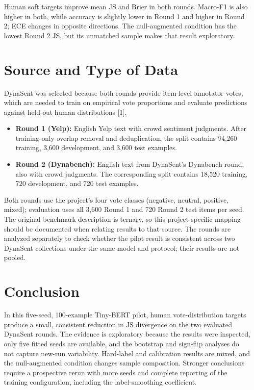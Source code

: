\documentclass[11pt,a4paper]{article}
\begin{document}
Human soft targets improve mean JS and Brier in both rounds. Macro-F1 is also higher in both, while accuracy is slightly lower in Round 1 and higher in Round 2; ECE changes in opposite directions. The null-augmented condition has the lowest Round 2 JS, but its unmatched sample makes that result exploratory.

\section{Source and Type of Data}
DynaSent was selected because both rounds provide item-level annotator votes, which are needed to train on empirical vote proportions and evaluate predictions against held-out human distributions [1].
\begin{itemize}
\item \textbf{Round 1 (Yelp):} English Yelp text with crowd sentiment judgments. After training-only overlap removal and deduplication, the split contains 94,260 training, 3,600 development, and 3,600 test examples.
\item \textbf{Round 2 (Dynabench):} English text from DynaSent's Dynabench round, also with crowd judgments. The corresponding split contains 18,520 training, 720 development, and 720 test examples.
\end{itemize}
Both rounds use the project's four vote classes (negative, neutral, positive, mixed); evaluation uses all 3,600 Round 1 and 720 Round 2 test items per seed. The original benchmark description is ternary, so this project-specific mapping should be documented when relating results to that source. The rounds are analyzed separately to check whether the pilot result is consistent across two DynaSent collections under the same model and protocol; their results are not pooled.

\section{Conclusion}
In this five-seed, 100-example Tiny-BERT pilot, human vote-distribution targets produce a small, consistent reduction in JS divergence on the two evaluated DynaSent rounds. The evidence is exploratory because the results were inspected, only five fitted seeds are available, and the bootstrap and sign-flip analyses do not capture new-run variability. Hard-label and calibration results are mixed, and the null-augmented condition changes sample composition. Stronger conclusions require a prospective rerun with more seeds and complete reporting of the training configuration, including the label-smoothing coefficient.
\end{document}
